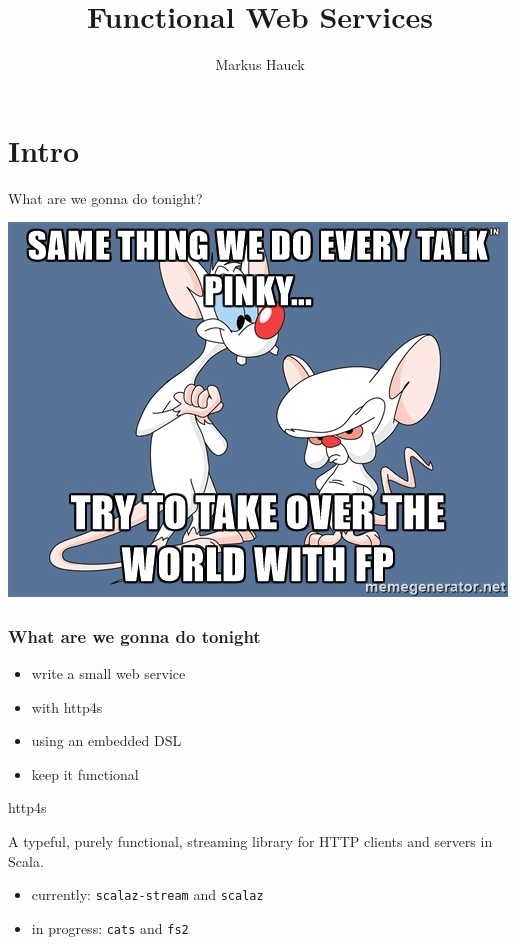 \documentclass{beamer}
\author{Markus Hauck}
\institute{codecentric AG}
\title{Functional Web Services}
\begin{document}
{
  \begin{frame}
    \titlepage{}
  \end{frame}
}

\begin{frame}
  \tableofcontents
\end{frame}

\section{Intro}

\begin{frame}
  \begin{center}
    \huge
    What are we gonna do tonight?
  \end{center}
\end{frame}

\begin{frame}
  \includegraphics[width=0.8\paperwidth]{pics/pinkybrain.jpg}
\end{frame}

\begin{frame}
  \frametitle{What are we gonna do tonight}
  \begin{itemize}
  \item write a small web service
  \item with http4s
  \item using an embedded DSL
  \item keep it functional
  \end{itemize}
\end{frame}

\begin{frame}{http4s}
  \begin{block}{}
    A typeful, purely functional, streaming library for HTTP
    clients and servers in Scala.
  \end{block}
  \begin{itemize}
  \item currently: \texttt{scalaz-stream} and \texttt{scalaz}
  \item in progress: \texttt{cats} and \texttt{fs2}
  \end{itemize}
\end{frame}
\end{document}
